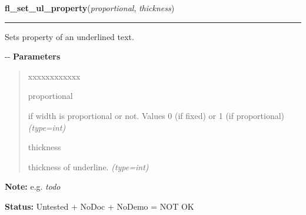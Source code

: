 \hspace{.8\funcindent}\begin{boxedminipage}{\funcwidth}

    \raggedright \textbf{fl\_set\_ul\_property}(\textit{proportional}, \textit{thickness})

    \vspace{-1.5ex}

    \rule{\textwidth}{0.5\fboxrule}
\setlength{\parskip}{2ex}

Sets property of an underlined text.

-{}-
\setlength{\parskip}{1ex}
      \textbf{Parameters}
      \vspace{-1ex}

      \begin{quote}
        \begin{Ventry}{xxxxxxxxxxxx}

          \item[proportional]


if width is proportional or not. Values 0 (if fixed) or 1 (if
proportional)
            {\it (type=int)}

          \item[thickness]


thickness of underline.
            {\it (type=int)}

        \end{Ventry}

      \end{quote}

\textbf{Note:} 
e.g. \emph{todo}


\textbf{Status:} 
Untested + NoDoc + NoDemo = NOT OK


    \end{boxedminipage}

    \label{xformslib:flxbasic:fl_set_clipping}

    \vspace{0.5ex}

